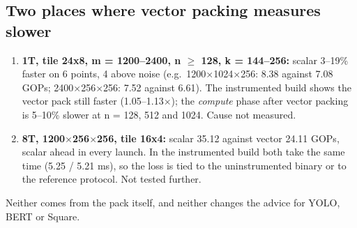 \subsection{Two places where vector packing measures slower}
\begin{enumerate}\setlength\itemsep{2pt}
\item \textbf{1T, tile 24x8, m = 1200--2400, n $\ge$ 128, k = 144--256:} scalar 3--19\% faster on 6 points, 4 above noise (e.g.\ 1200$\times$1024$\times$256: 8.38 against 7.08 GOPs; 2400$\times$256$\times$256: 7.52 against 6.61). The instrumented build shows the vector pack still faster (1.05--1.13$\times$); the \emph{compute} phase after vector packing is 5--10\% slower at n = 128, 512 and 1024. Cause not measured.
\item \textbf{8T, 1200$\times$256$\times$256, tile 16x4:} scalar 35.12 against vector 24.11 GOPs, scalar ahead in every launch. In the instrumented build both take the same time (5.25 / 5.21 ms), so the loss is tied to the uninstrumented binary or to the reference protocol. Not tested further.
\end{enumerate}
Neither comes from the pack itself, and neither changes the advice for YOLO, BERT or Square.
